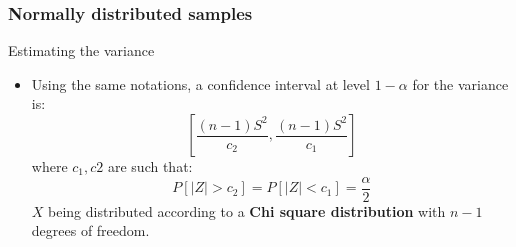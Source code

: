 \documentclass[main.tex]{subfiles}
\begin{document}
\begin{frame}
    \frametitle{Normally distributed samples}
    \begin{block}{Estimating the variance}
\begin{itemize}
    \item<+-> Using the same notations, a confidence interval at level $1-\alpha$ for the variance is:
    \begin{equation}
        \left[ \frac{(n-1)S^2}{c_2}, \frac{(n-1)S^2}{c_1} \right]
    \end{equation}
    where $c_1,c2$ are such that:
    \begin{equation}
        P\left[ \lvert Z \rvert > c_2 \right] = P\left[ \lvert Z \rvert < c_1 \right] = \frac{\alpha}{2}
    \end{equation}
    $X$ being distributed according to a \textbf{Chi square distribution} with $n-1$ degrees of freedom.
\end{itemize}
    \end{block}
\end{frame}
\end{document}
